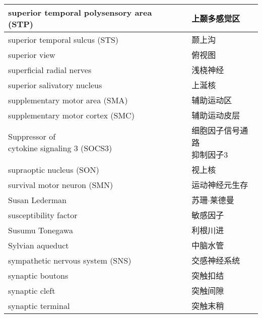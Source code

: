 \begin{longtable}{lll}
	\midrule
	superior temporal polysensory area (STP)   && 上颞多感觉区 \\
	
	\midrule
	superior temporal sulcus (STS)   && 颞上沟 \\
	
	\midrule
	superior view   && 俯视图 \\
	
	\midrule
	superficial radial nerves   && 浅桡神经 \\
	
	\midrule
	superior salivatory nucleus   && 上涎核 \\
	
	\midrule
	supplementary motor area (SMA)   && 辅助运动区 \\
	
	\midrule
	supplementary motor cortex (SMC)   && 辅助运动皮层 \\
	
	\midrule
	\makecell[l]{Suppressor of \\cytokine signaling 3 (SOCS3)}  && \makecell[l]{细胞因子信号通路\\抑制因子3} \\
	
	\midrule
	supraoptic nucleus (SON)  && 视上核 \\
	
	\midrule
	survival motor neuron (SMN) && 运动神经元生存 \\
	
	\midrule
	Susan Lederman && 苏珊$\cdot$莱德曼 \\
	
	\midrule
	susceptibility factor && 敏感因子 \\
	
	\midrule
	Susumu Tonegawa && 利根川进 \\
	
	\midrule
	Sylvian aqueduct && 中脑水管 \\
	
	\midrule
	sympathetic nervous system (SNS) && 交感神经系统 \\
	
	\midrule
	synaptic boutons && 突触扣结 \\
	
	\midrule
	synaptic cleft && 突触间隙 \\
	
	\midrule
	synaptic terminal && 突触末稍 \\
	

\end{longtable}
